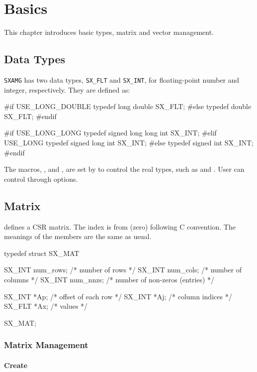 
\chapter{Basics}

This chapter introduces basic types, matrix and vector management.

\section{Data Types}

\verb|SXAMG| has two data types, \verb|SX_FLT| and \verb|SX_INT|, for floating-point number
and integer, respectively. They are defined as:
\begin{evb}
#if USE_LONG_DOUBLE
typedef long double              SX_FLT;
#else
typedef double                   SX_FLT;
#endif

#if USE_LONG_LONG
typedef signed long long int     SX_INT;
#elif USE_LONG
typedef signed long int          SX_INT;
#else
typedef signed int               SX_INT;
#endif

\end{evb}

The macros, ,  and , are set by  to
control the real types, such as  and . 
User can control through   options.

\section{Matrix}
 defines a CSR matrix. The index is from  (zero) following C convention. 
The meanings of the members are the same as usual.
\begin{evb}
typedef struct SX_MAT
{
    SX_INT num_rows;   /* number of rows */
    SX_INT num_cols;   /* number of columns */
    SX_INT num_nnzs;   /* number of non-zeros (entries) */

    SX_INT   *Ap;      /* offset of each row */
    SX_INT   *Aj;      /* column indices */
    SX_FLT *Ax;      /* values */

} SX_MAT;
\end{evb}

\subsection{Matrix Management}

\subsubsection{Create}

